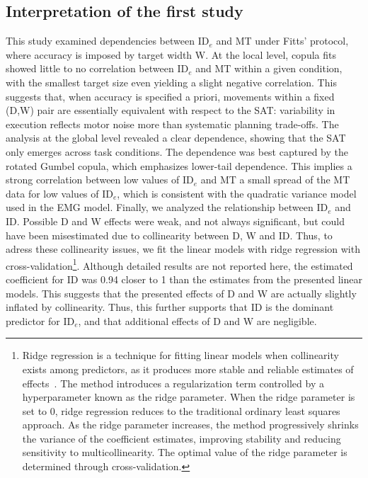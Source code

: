 \documentclass[acmlarge, manuscript,review]{acmart}
\newcommand{\ide}{\ensuremath{{\text{ID}_e}}\xspace}
\begin{document}
\subsection{Interpretation of the first study \label{study_one:interpretation}}
This study examined dependencies between \ide and MT under Fitts' protocol, where accuracy is imposed by target width W. At the local level, copula fits showed little to no correlation between \ide and MT within a given condition, with the smallest target size even yielding a slight negative correlation. This suggests that, when accuracy is specified a priori, movements within a fixed (D,W) pair are essentially equivalent with respect to the SAT: variability in execution reflects motor noise more than systematic planning trade-offs.
The analysis at the global level revealed a clear dependence, showing that the SAT only emerges across task conditions. The dependence was best captured by the rotated Gumbel copula, which emphasizes lower-tail dependence. This implies a strong correlation between low values of \ide and MT \ie a small spread of the MT data for low values of \ide, which is consistent with the quadratic variance model used in the EMG model.
Finally, we analyzed the relationship between \ide and ID. Possible D and W effects were weak, and not always significant, but could have been misestimated due to collinearity between D, W and ID. Thus, to adress these collinearity issues, we fit the linear models with ridge regression with cross-validation\footnote{Ridge regression is a technique for fitting linear models when collinearity exists among predictors, as it produces more stable and reliable estimates of effects~\cite{gruber2017}. The method introduces a regularization term controlled by a hyperparameter known as the ridge parameter. When the ridge parameter is set to 0, ridge regression reduces to the traditional ordinary least squares approach. As the ridge parameter increases, the method progressively shrinks the variance of the coefficient estimates, improving stability and reducing sensitivity to multicollinearity. The optimal value of the ridge parameter is determined through cross-validation.}. Although detailed results are not reported here, the estimated coefficient for ID was 0.94 \ie closer to 1 than the estimates from the presented linear models. This suggests that the presented effects of D and W are actually slightly inflated by collinearity. Thus, this further supports that ID is the dominant predictor for \ide, and that additional effects of D and W are negligible.
\end{document}
